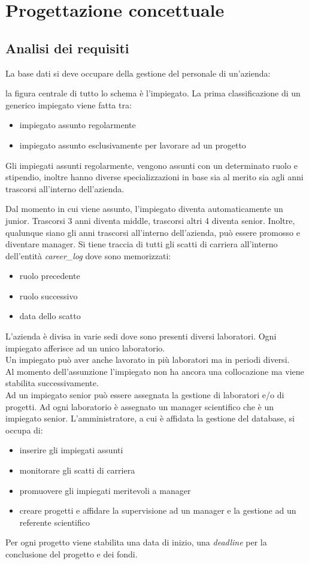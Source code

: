 \section{Progettazione concettuale}
\subsection{Analisi dei requisiti}
La base dati si deve occupare della gestione del personale di un'azienda:

la figura centrale di tutto lo schema è l'impiegato.\sskip
La prima classificazione di un generico impiegato viene fatta tra:
\begin{itemize}
	\item impiegato assunto regolarmente
	\item impiegato assunto esclusivamente per lavorare ad un progetto
\end{itemize}\medskip
Gli impiegati assunti regolarmente, vengono assunti con un determinato ruolo e stipendio, inoltre hanno diverse specializzazioni in base sia al merito sia agli anni trascorsi all'interno dell'azienda.

Dal momento in cui viene assunto, l'impiegato diventa automaticamente un junior. Trascorsi 3 anni diventa middle, trascorsi altri 4 diventa senior.
Inoltre, qualunque siano gli anni trascorsi all'interno dell'azienda, può essere promosso e diventare manager.\sskip
Si tiene traccia di tutti gli scatti di carriera all'interno dell'entità \textit{career\_log} dove sono memorizzati:
\begin{itemize}
	\item ruolo precedente
	\item ruolo successivo
	\item data dello scatto
\end{itemize}\medskip
L'azienda è divisa in varie sedi dove sono presenti diversi laboratori.\sskip
Ogni impiegato afferisce ad un unico laboratorio.\\
Un impiegato può aver anche lavorato in più laboratori ma in periodi diversi.\\
Al momento dell'assunzione l'impiegato non ha ancora una collocazione ma viene stabilita successivamente.\\
Ad un impiegato senior può essere assegnata la gestione di laboratori e/o di progetti.\sskip
Ad ogni laboratorio è assegnato un manager scientifico che è un impiegato senior.\sskip
L'amministratore, a cui è affidata la gestione del database, si occupa di:
\begin{itemize}
	\item inserire gli impiegati assunti
	\item monitorare gli scatti di carriera
	\item promuovere gli impiegati meritevoli a manager
	\item creare progetti e affidare la supervisione ad un manager e la gestione ad un referente scientifico
\end{itemize}\smallskip
Per ogni progetto viene stabilita una data di inizio, una \textit{deadline} per la conclusione del progetto e dei fondi.

